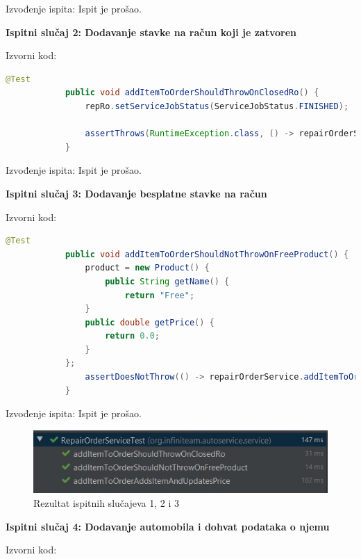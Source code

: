 			\noindent Izvođenje ispita: Ispit je prošao.
			
			\hfill\break
			\noindent\textbf{Ispitni slučaj 2: Dodavanje stavke na račun koji je zatvoren}
			
			\noindent Izvorni kod:
			
			\begin{lstlisting}[language=Java]
			@Test
			public void addItemToOrderShouldThrowOnClosedRo() {
				repRo.setServiceJobStatus(ServiceJobStatus.FINISHED);
			
				assertThrows(RuntimeException.class, () -> repairOrderService.addItemToOrder(repRo, product));
			}
			\end{lstlisting}
			
			\noindent Izvođenje ispita: Ispit je prošao.

			\hfill\break
			\noindent\textbf{Ispitni slučaj 3: Dodavanje besplatne stavke na račun}
			
			\noindent Izvorni kod:
			
			\begin{lstlisting}[language=Java]
			@Test
			public void addItemToOrderShouldNotThrowOnFreeProduct() {
				product = new Product() {
					public String getName() {
						return "Free";
				} 
				public double getPrice() {
					return 0.0;
				}
			};
				assertDoesNotThrow(() -> repairOrderService.addItemToOrder(repRo, product));
			}
			\end{lstlisting}
			
			\noindent Izvođenje ispita: Ispit je prošao.
			
			\hfill
			\begin{figure}[H]
				\includegraphics[scale=0.7]{slike/test/repair.JPG}
				\centering
				\caption{Rezultat ispitnih slučajeva 1, 2 i 3}
				\label{fig:testrepair}
			\end{figure}
			
			\hfill\break
			\noindent\textbf{Ispitni slučaj 4: Dodavanje automobila i dohvat podataka o njemu}
			
			\noindent Izvorni kod:
			
